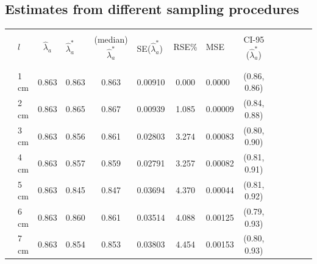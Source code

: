 \documentclass[a4paper 12pt]{article}
\numberwithin{equation}{section}
\begin{document}
\subsection{Estimates from different sampling procedures}
\label{secAP:resultssamplingprocedure}
\clearpage
 \begin{small}
\begin{table}[h!]
\centering
\setlength\tabcolsep{11.5pt} 
\begin{footnotesize}
\begin{tabular}{clclclclclclcl}
  \hline \\ [0.3ex]
&  $l$ & $\hat{\lambda}_{a}$  & $\hat{\lambda}_{a}^{*}$ & (median) $\hat{\lambda}_{a}^{*}$ & SE($\hat{\lambda}_{a}^{*}$) & RSE\%  & MSE  &  CI-95 ($\hat{\lambda}_{a}^{*}$) \\ [1.0ex]
\hline \\
 \raisebox{1ex}{\bf age 1}  \\ [1.0ex]
&   1 cm & 0.863 &    0.863  & 0.863 &         0.00910& 0.000 & 0.0000  & (0.86, 0.86)\\
&   2 cm & 0.863 &    0.865  & 0.867 &         0.00939& 1.085 & 0.00009 & (0.84, 0.88)\\
&   3 cm & 0.863 &    0.856  & 0.861 &         0.02803& 3.274 & 0.00083 & (0.80, 0.90) \\
&   4 cm & 0.863 &    0.857  & 0.859 &         0.02791& 3.257 & 0.00082 & (0.81, 0.91) \\
&   5 cm & 0.863 &    0.845  & 0.847 &         0.03694& 4.370 & 0.00044 & (0.81, 0.92)\\
&   6 cm & 0.863 &    0.860  & 0.861 &         0.03514& 4.088 & 0.00125 & (0.79, 0.93)\\
&   7 cm & 0.863 &    0.854  & 0.853 &         0.03803& 4.454 & 0.00153 & (0.80, 0.93)\\[1.5ex]


\end{tabular}
\end{footnotesize}
\end{table}
\end{small}
\end{document}
